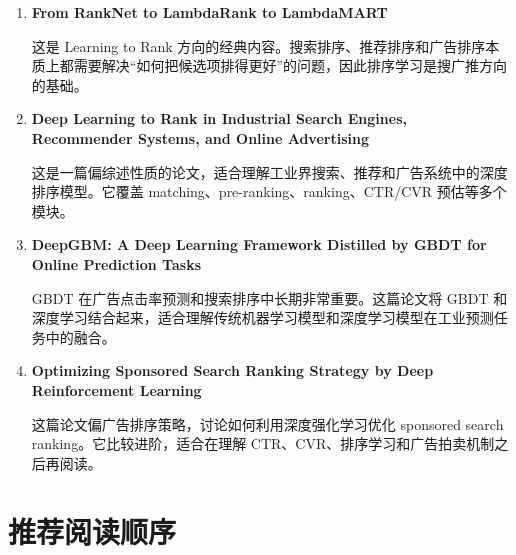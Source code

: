 \begin{enumerate}
    \item \textbf{From RankNet to LambdaRank to LambdaMART}

    这是 Learning to Rank 方向的经典内容。搜索排序、推荐排序和广告排序本质上都需要解决“如何把候选项排得更好”的问题，因此排序学习是搜广推方向的基础。

    \item \textbf{Deep Learning to Rank in Industrial Search Engines, Recommender Systems, and Online Advertising}

    这是一篇偏综述性质的论文，适合理解工业界搜索、推荐和广告系统中的深度排序模型。它覆盖 matching、pre-ranking、ranking、CTR/CVR 预估等多个模块。

    \item \textbf{DeepGBM: A Deep Learning Framework Distilled by GBDT for Online Prediction Tasks}

    GBDT 在广告点击率预测和搜索排序中长期非常重要。这篇论文将 GBDT 和深度学习结合起来，适合理解传统机器学习模型和深度学习模型在工业预测任务中的融合。

    \item \textbf{Optimizing Sponsored Search Ranking Strategy by Deep Reinforcement Learning}

    这篇论文偏广告排序策略，讨论如何利用深度强化学习优化 sponsored search ranking。它比较进阶，适合在理解 CTR、CVR、排序学习和广告拍卖机制之后再阅读。
\end{enumerate}

\section{推荐阅读顺序}

